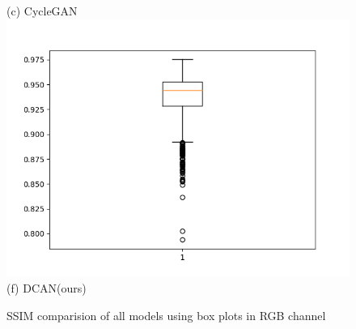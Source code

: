 \documentclass[conference]{IEEEtran}
\begin{document}
\begin{figure}[h!]
\begin{minipage}{0.3\textwidth}
  (c) CycleGAN 
  \includegraphics[width=\textwidth,height=0.2\textheight]{Figures/proposed_ssim_rgb.png}
  (f) DCAN(ours)
  \end{minipage}%
  \caption{SSIM comparision of all models using box plots in RGB channel}
  \label{SSIM:RGB}
  \end{figure}
  
\end{document}
